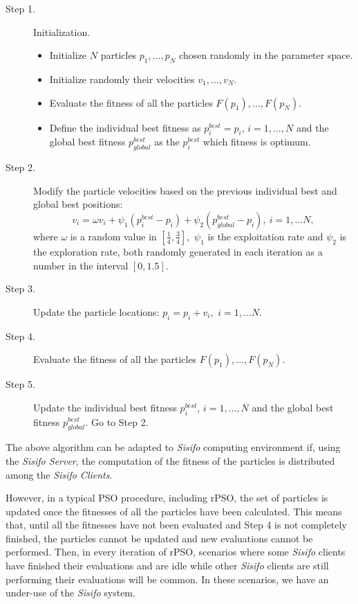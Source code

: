 \begin{description}
	\item[Step 1.] Initialization.
	\begin{itemize}
		\item Initialize $N$ particles $p_1, \ldots, p_N$ chosen randomly in the parameter space.
		\item Initialize randomly their velocities $v_1, \ldots, v_N$.
		\item Evaluate the fitness of all the particles $F(p_1), \ldots, F(p_N)$.
		\item Define the individual best fitness as $p_i^{best} = p_i$, $i=1,\ldots,N$ and the global best fitness $p_{global}^{best}$ as the $p_i^{best}$ which fitness is optimum.
	\end{itemize}
	\item[Step 2.] Modify the particle velocities based on the previous individual best and global best positions: 
	\[v_i = \omega v_i + \psi_1 ( p_i^{best} - p_i ) + \psi_2 ( p_{global}^{best} - p_i ), \ i=1,\ldots N, \]
	where $\omega$ is a random value in $[\frac{1}{4}, \frac{3}{4}],$ $\psi_1$ is the exploitation rate and $\psi_2$ is the exploration rate, both randomly generated in each iteration as a number in the interval $[0,1.5]$.
	\item[Step 3.] Update the particle locations: $p_i = p_i + v_i,$  $i=1,\ldots N$. 
	\item[Step 4.] Evaluate the fitness of all the particles $F(p_1), \ldots, F(p_N)$. 
	\item[Step 5.] Update the individual best fitness $p_i^{best}$, $i=1,\ldots,N$ and  the global best fitness $p_{global}^{best}$. Go to Step 2. 
\end{description}

The above algorithm can be adapted to \textit{Sisifo} computing environment if, using the \textit{Sisifo Server}, the computation of the fitness of the particles is distributed among the \textit{Sisifo Clients}.

However, in a typical PSO procedure, including rPSO, the set of particles is updated once the fitnesses of all the particles have been calculated. This means that, until all the fitnesses have not been evaluated and Step 4 is not completely finished, the particles cannot be updated and new evaluations cannot be performed. Then, in every iteration of rPSO, scenarios where some \textit{Sisifo} clients have finished their evaluations and are idle while other \textit{Sisifo} clients are still performing their evaluations will be common. In these scenarios, we have an under-use of the \textit{Sisifo} system.


